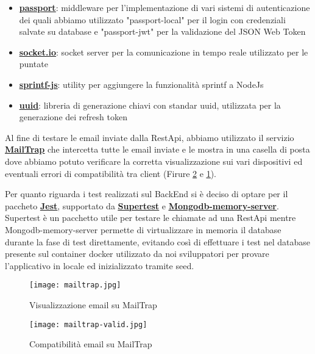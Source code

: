 \begin{itemize}
	\item \textbf{\underline{\href{http://www.passportjs.org}{passport}}}: middleware per l'implementazione di vari sistemi di autenticazione dei quali abbiamo utilizzato "passport-local" per il login con credenziali salvate su database e "passport-jwt" per la validazione del JSON Web Token
	\item \textbf{\underline{\href{https://socket.io/}{socket.io}}}: socket server per la comunicazione in tempo reale utilizzato per le puntate
	\item \textbf{\underline{\href{https://www.npmjs.com/package/sprintf-js}{sprintf-js}}}: utility per aggiungere la funzionalità sprintf a NodeJs
	\item \textbf{\underline{\href{https://www.npmjs.com/package/uuid}{uuid}}}: libreria di generazione chiavi con standar uuid, utilizzata per la generazione dei refresh token
\end{itemize}

Al fine di testare le email inviate dalla RestApi, abbiamo utilizzato il servizio \textbf{\underline{\href{https://mailtrap.io}{MailTrap}}}
che intercetta tutte le email inviate e le mostra in una casella di posta 
dove abbiamo potuto verificare la corretta visualizzazione sui vari dispositivi 
ed eventuali errori di compatibilità tra client (Firure \underline{\ref{fig:mailtrapValid}} e \underline{\ref{fig:mailtrap}}).

Per quanto riguarda i test realizzati sul BackEnd si è deciso di optare per il paccheto \textbf{\underline{\href{https://jestjs.io/docs/getting-started}{Jest}}},
supportato da \textbf{\underline{\href{https://www.npmjs.com/package/supertest}{Supertest}}} e \textbf{\underline{\href{https://github.com/nodkz/mongodb-memory-server}{Mongodb-memory-server}}}.
Supertest è un pacchetto utile per testare le chiamate ad una RestApi mentre 
Mongodb-memory-server permette di virtualizzare in memoria il database durante la fase di test direttamente, 
evitando così di effettuare i test nel database presente sul container docker utilizzato da noi sviluppatori 
per provare l'applicativo in locale ed inizializzato tramite seed. 

\begin{figure}[H]
	\centering
	\texttt{[image: mailtrap.jpg]}
	\caption{Visualizzazione email su MailTrap}
	\label{fig:mailtrap}
\end{figure}

\begin{figure}[H]
	\centering
	\texttt{[image: mailtrap-valid.jpg]}
	\caption{Compatibilità email su MailTrap}
	\label{fig:mailtrapValid}
\end{figure}

